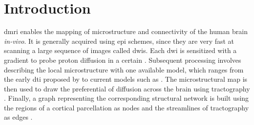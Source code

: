 \section{Introduction}\label{sec:introduction}
\Gls*{dmri} enables the mapping of microstructure \citep{basser_microstructural_1996}
  and connectivity \citep{craddock_imaging_2013} of the human brain \emph{in-vivo}.
It is generally acquired using \gls*{epi} schemes, since they are very fast at
  scanning a large sequence of images called \glspl*{dwi}.
Each \gls*{dwi} is sensitized with a gradient to probe proton diffusion in a certain
  .
Subsequent processing involves describing the local microstructure with one available
  model, which ranges from the early \gls*{dti} proposed by \cite{basser_microstructural_1996}
  to current models such as \citep{daducci_accelerated_2015}.
The microstructural map is then used to draw the preferential  of diffusion
  across the brain using tractography \citep{mori_threedimensional_1999}.
Finally, a graph representing the corresponding structural network is built using
  the regions of a cortical parcellation as nodes and the streamlines of
  tractography as edges \citep{hagmann_mapping_2008}.

